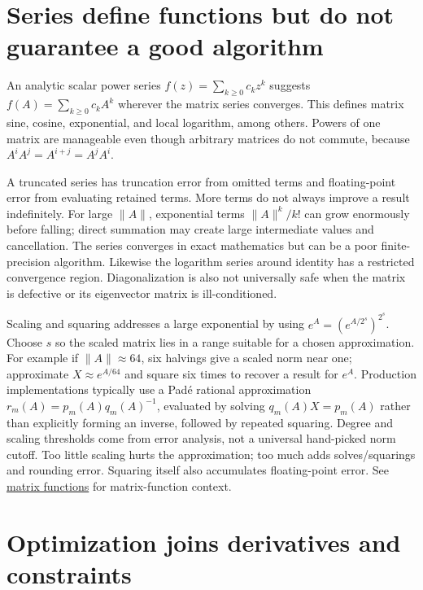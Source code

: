 \section{Series define functions but do not guarantee a good algorithm}\label{02-foundations-ii-ch026-series-define-functions-but-do-not-guarantee-a-good-algorithm}

An analytic scalar power series \(f(z)=\sum_{k\ge0}c_kz^k\) suggests \(f(A)=\sum_{k\ge0}c_kA^k\) wherever the matrix series converges. This defines matrix sine, cosine, exponential, and local logarithm, among others. Powers of one matrix are manageable even though arbitrary matrices do not commute, because \(A^iA^j=A^{i+j}=A^jA^i\).

A truncated series has truncation error from omitted terms and floating-point error from evaluating retained terms. More terms do not always improve a result indefinitely. For large \(\|A\|\), exponential terms \(\|A\|^k/k!\) can grow enormously before falling; direct summation may create large intermediate values and cancellation. The series converges in exact mathematics but can be a poor finite-precision algorithm. Likewise the logarithm series around identity has a restricted convergence region. Diagonalization is also not universally safe when the matrix is defective or its eigenvector matrix is ill-conditioned.

Scaling and squaring addresses a large exponential by using \(e^A=(e^{A/2^s})^{2^s}\). Choose \(s\) so the scaled matrix lies in a range suitable for a chosen approximation. For example if \(\|A\|\approx64\), six halvings give a scaled norm near one; approximate \(X\approx e^{A/64}\) and square six times to recover a result for \(e^A\). Production implementations typically use a Padé rational approximation \(r_m(A)=p_m(A)q_m(A)^{-1}\), evaluated by solving \(q_m(A)X=p_m(A)\) rather than explicitly forming an inverse, followed by repeated squaring. Degree and scaling thresholds come from error analysis, not a universal hand-picked norm cutoff. Too little scaling hurts the approximation; too much adds solves/squarings and rounding error. Squaring itself also accumulates floating-point error. See \hyperref[02-foundations-ii-ch026-matrix-functions-turn-repeated-linear-actions-into-one-operator]{matrix functions} for matrix-function context.

\section{Optimization joins derivatives and constraints}\label{02-foundations-ii-ch026-optimization-joins-derivatives-and-constraints}

